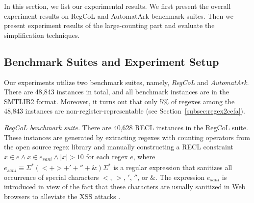 In this section, we list our experimental results. We first present the overall experiment results on RegCoL and AutomatArk benchmark suites. Then we present experiment results of the large-counting part and evaluate the simplification techniques. 


\subsection{Benchmark Suites and Experiment Setup}\label{sec:bench}

Our experiments utilize two benchmark suites, namely, \emph{RegCoL} and \emph{AutomatArk}.  There are 48,843 instances in total, and all benchmark instances are in the SMTLIB2 format.
Moreover, it turns out that only 5\% of regexes among the 48,843 instances are non-register-representable (see Section~\ref{subsec:regex2cefa}).

\medskip
\noindent
\emph{RegCoL benchmark suite.} There are 40,628 RECL instances in the RegCoL suite. These instances are generated by extracting regexes with counting operators from the open source regex library \cite{regex_lingua_franca,redos_lenka} and manually constructing a RECL constraint $x \in e \wedge x \in e_{sani} \wedge |x| > 10$ for each regex $e$,
where $e_{sani} \equiv \overline{\Sigma^*(<+ >+'+''+\&)\Sigma^*}$ is a regular expression that sanitizes all occurrence of special characters $<$, $>$, $'$, $''$, or $\&$. 
The expression $e_{sani}$ is introduced in view of the fact that these characters are usually sanitized in Web browsers to alleviate the XSS attacks \cite{malware_detection_3_kudzu,CCH_18}.

